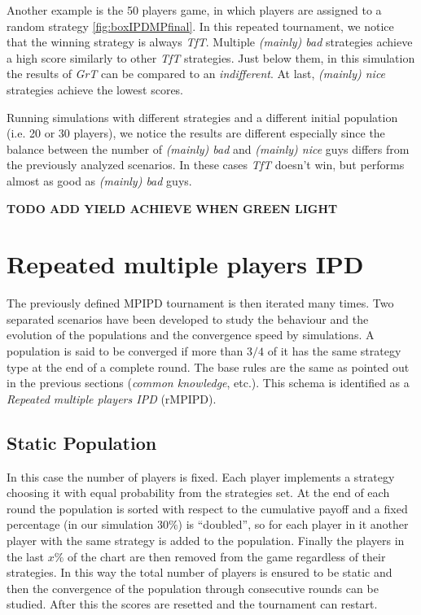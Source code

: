 \documentclass[journal,a4paper,10pt,twoside]{IEEEtran} %
\begin{document}
Another example is the 50 players game, in which players are assigned to a random strategy \autoref{fig:boxIPDMPfinal}. In this repeated tournament, we notice that the winning strategy is always \textit{TfT}. Multiple \textit{(mainly) bad} strategies achieve a high score similarly to other \textit{TfT} strategies. Just below them, in this simulation the results of \textit{GrT} can be compared to an \textit{indifferent}. At last, \textit{(mainly) nice} strategies achieve the lowest scores.

Running simulations with different strategies and a different initial population (i.e. 20 or 30 players), we notice the results are different especially since the balance between the number of \textit{(mainly) bad} and \textit{(mainly) nice} guys differs from the previously analyzed scenarios. In these cases \textit{TfT} doesn't win, but performs almost as good as \textit{(mainly) bad} guys.

\textbf{TODO ADD YIELD ACHIEVE WHEN GREEN LIGHT}

\section{Repeated multiple players IPD} \label{s:rIPDMP}
The previously defined MPIPD tournament is then iterated many times.
Two separated scenarios have been developed to study the behaviour and the evolution of the populations and the convergence speed by simulations. A population is said to be converged if more than $3/4$ of it has the same strategy type at the end of a complete round. The base rules are the same as pointed out in the previous sections (\textit{common knowledge},  etc.).
This schema is identified as a \textit{Repeated multiple players IPD} (rMPIPD).

\subsection{Static Population}
In this case the number of players is fixed. Each player implements a strategy choosing it with equal probability from the strategies set. At the end of each round the population is sorted with respect to the cumulative payoff and a fixed percentage (in our simulation $30\%$) is ``doubled'', so for each player in it another player with the same strategy is added to the population. Finally the players in the last $x\%$ of the chart are then removed from the game regardless of their strategies. In this way the total number of players is ensured to be static and then the convergence of the population through consecutive rounds can be studied. After this the scores are resetted and the tournament can restart.
\end{document}
